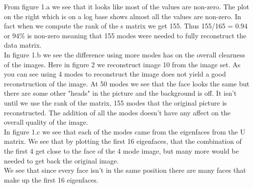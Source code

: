\documentclass[]{article}
\begin{document}
From figure 1.a we see that it looks like most of the values are non-zero. The plot on the right which is on a log base shows almost all the values are non-zero. In fact when we compute the rank of the s matrix we get 155. Thus 155/165 = 0.94 or 94\% is non-zero meaning that 155 modes were needed to fully reconstruct the data matrix. \\
In figure 1.b we see the difference using more modes has on the overall clearness of the images. Here in figure 2 we reconstruct image 10 from the image set.
As you can see using 4 modes to reconstruct the image does not yield a good reconstruction of the image. At 50 modes we see that the face looks the same but there are some other "heads" in the picture and the background is off. It isn't until we use the rank of the matrix, 155 modes that the original picture is reconstructed. The addition of all the modes doesn't have any affect on the overall quality of the image.\\
In figure 1.c we see that each of the modes came from the eigenfaces from the U matrix. We see that by plotting the first 16 eigenfaces, that the combination of the first 4 get close to the face of the 4 mode image, but many more would be needed to get back the original image.\\
We see that since every face isn't in the same position there are many faces that make up the first 16 eigenfaces.
\end{document}
